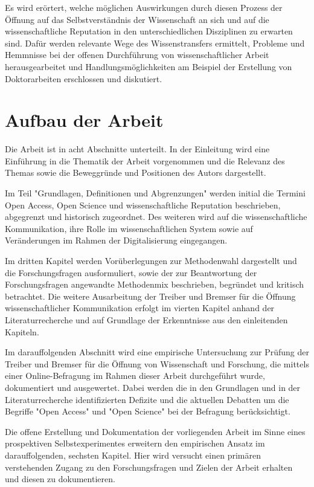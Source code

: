 Es wird erörtert, welche möglichen Auswirkungen durch diesen Prozess der Öffnung auf das Selbstverständnis der Wissenschaft an sich und auf die wissenschaftliche Reputation in den unterschiedlichen Disziplinen zu erwarten sind. Dafür werden relevante Wege des Wissenstransfers ermittelt, Probleme und Hemmnisse bei der offenen Durchführung von wissenschaftlicher Arbeit herausgearbeitet und Handlungsmöglichkeiten am Beispiel der Erstellung von Doktorarbeiten erschlossen und diskutiert.

\section{Aufbau der Arbeit}

Die Arbeit ist in acht Abschnitte unterteilt. In der Einleitung wird eine Einführung in die Thematik der Arbeit vorgenommen und die Relevanz des Themas sowie die Beweggründe und Positionen des Autors dargestellt.

Im Teil "Grundlagen, Definitionen und Abgrenzungen" werden initial die Termini Open Access, Open Science und wissenschaftliche Reputation beschrieben, abgegrenzt und historisch zugeordnet. Des weiteren wird auf die wissenschaftliche Kommunikation, ihre Rolle im wissenschaftlichen System sowie auf Veränderungen im Rahmen der Digitalisierung eingegangen.

Im dritten Kapitel werden Vorüberlegungen zur Methodenwahl dargestellt und die Forschungsfragen ausformuliert, sowie der zur Beantwortung der Forschungsfragen angewandte Methodenmix beschrieben, begründet und kritisch betrachtet. Die weitere Ausarbeitung der Treiber und Bremser für die Öffnung wissenschaftlicher Kommunikation erfolgt im vierten Kapitel anhand der Literaturrecherche und auf Grundlage der Erkenntnisse aus den einleitenden Kapiteln.

Im darauffolgenden Abschnitt wird eine empirische Untersuchung zur Prüfung der Treiber und Bremser für die Öffnung von Wissenschaft und Forschung, die mittels einer Online-Befragung im Rahmen dieser Arbeit durchgeführt wurde, dokumentiert und ausgewertet. Dabei werden die in den Grundlagen und in der Literaturrecherche identifizierten Defizite und die aktuellen Debatten um die Begriffe "Open Access" und "Open Science" bei der Befragung berücksichtigt.

Die offene Erstellung und Dokumentation der vorliegenden Arbeit im Sinne eines prospektiven Selbstexperimentes erweitern den empirischen Ansatz im darauffolgenden, sechsten Kapitel. Hier wird versucht einen primären verstehenden Zugang zu den Forschungsfragen und Zielen der Arbeit erhalten und diesen zu dokumentieren.

